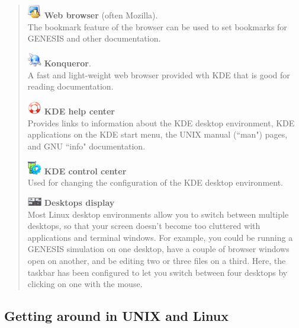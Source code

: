 \documentclass[12pt]{article}
\begin{document}
\begin{quote}
	\includegraphics[width=0.05\textwidth]{figures/konsole.eps} {\bf Web browser} (often Mozilla).\\
	The bookmark feature of the browser can be used to set bookmarks for GENESIS and other documentation.

	\includegraphics[width=0.05\textwidth]{figures/konqueror.eps} {\bf Konqueror}.\\
	A fast and light-weight web browser provided wth KDE that is good for reading documentation.

	\includegraphics[width=0.05\textwidth]{figures/khelpcenter.eps} {\bf KDE help center }\\
	Provides links to information about the KDE desktop environment, KDE applications on the KDE start menu, the UNIX manual (``man") pages, and GNU ``info" documentation.

	\includegraphics[width=0.05\textwidth]{figures/kcontrol.eps} {\bf KDE control center}\\
	Used for changing the configuration of the KDE desktop environment.
	
	\includegraphics[width=0.05\textwidth]{figures/desktops.eps} {\bf Desktops display}\\
	Most Linux desktop environments allow you to switch between multiple desktops, so that your screen doesn't become too cluttered with applications and terminal windows. For example, you could be running a GENESIS simulation on one desktop, have a couple of browser windows open on another, and be editing two or three files on a third. Here, the taskbar has been configured to let you switch between four desktops by clicking on one with the mouse. 
\end{quote}

\subsection*{Getting around in UNIX and Linux}
\end{document}

